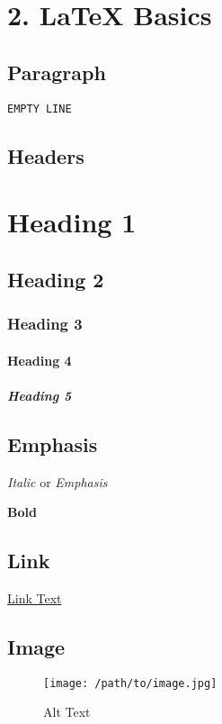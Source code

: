 \section{2. LaTeX Basics}

\subsection{Paragraph}

\texttt{EMPTY\ LINE}

\subsection{Headers}

\section{Heading 1}

\subsection{Heading 2}

\subsubsection{Heading 3}

\paragraph{Heading 4}

\subparagraph{Heading 5}

\subsection{Emphasis}

\textit{Italic} or \emph{Emphasis}

\textbf{Bold}

\subsection{Link}

\href{http://www.pandoc.org}{Link Text}

\subsection{Image}

\begin{figure}[htbp]
\centering
\texttt{[image: /path/to/image.jpg]}
\caption{Alt Text}
\end{figure}

